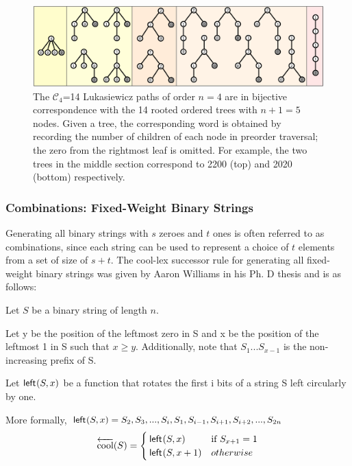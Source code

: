 \begin{figure}[]
	\centering
	\includegraphics[width = .95 \textwidth]{trees.png}
	\caption{The $\mathcal{C}_4$=14 Lukasiewicz paths of order $n=4$ are in bijective correspondence with the 14 rooted ordered trees with $n+1=5$ nodes.  Given a tree, the corresponding word is obtained by recording the number of children of each node in preorder traversal; the zero from the rightmost leaf is omitted.  For example, the two trees in the middle section correspond to 2200 (top) and 2020 (bottom) respectively.}
	\label{trees}
\end{figure}

\subsubsection{Combinations: Fixed-Weight Binary Strings}
Generating all binary strings with $s$ zeroes and $t$ ones is often referred to as combinations, since each string can be used to represent a choice of $t$ elements from a set of size of $s+t$.  The cool-lex successor rule for generating all fixed-weight binary strings was given by Aaron Williams in his Ph. D thesis and is as follows\cite{williams2009shift}:

\noindent Let $S$ be a binary string of length $n$.

\noindent Let y be the position of the leftmost zero in S and x be the position of the leftmost 1 in S such that $x \ge y$.  Additionally, note that $S_1...S_{x-1}$ is the non-increasing prefix of S.

Let $\mathsf{left}_{}(S,x)$ be a function that rotates the first i bits of a string S left circularly by one.

More formally, 
\noindent $\mathsf{left}_{}(S,x)=S_2,S_3,...,S_i,S_1,S_{i-1},S_{i+1},S_{i+2},...,S_{2n}$
\begin{equation*}
    \overleftarrow{\text{cool}}(S) = \begin{cases}
	\mathsf{left}_{}(S,x) & \text{if $S_{x+1}=1$}\\
	\mathsf{left}_{}(S,x+1) & otherwise\\
\end{cases}
\end{equation*}

